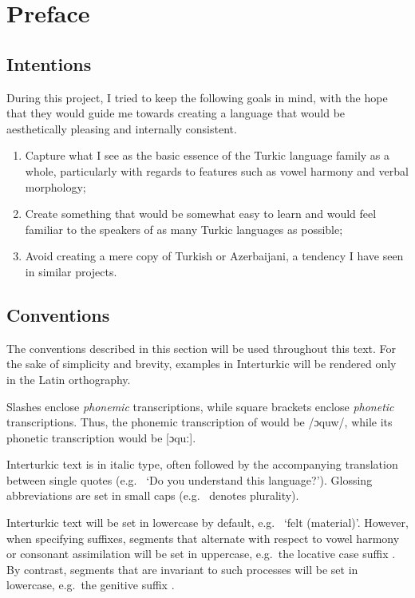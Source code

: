\chapter{Preface}

\section{Intentions}

During this project, I tried to keep the following goals in mind, with the hope that they would guide me towards creating a language that would be aesthetically pleasing and internally consistent.

\begin{enumerate}
	\item Capture what I see as the basic essence of the Turkic language family as a whole, particularly with regards to features such as vowel harmony and verbal morphology;
	\item Create something that would be somewhat easy to learn and would feel familiar to the speakers of as many Turkic languages as possible;
	\item Avoid creating a mere copy of Turkish or Azerbaijani, a tendency I have seen in similar projects.
\end{enumerate}

\section{Conventions}

The conventions described in this section will be used throughout this text.
For the sake of simplicity and brevity, examples in Interturkic will be rendered only in the Latin orthography.

Slashes enclose \emph{phonemic} transcriptions, while square brackets enclose \emph{phonetic} transcriptions.
Thus, the phonemic transcription of  would be /ɔquw/, while its phonetic transcription would be [ɔquː].

Interturkic text is in italic type, often followed by the accompanying translation between single quotes (e.g.\  `Do you understand this language?').
Glossing abbreviations are set in small caps (e.g.\ \Pl{} denotes plurality).

Interturkic text will be set in lowercase by default, e.g.\  `felt (material)'.
However, when specifying suffixes, segments that alternate with respect to vowel harmony or consonant assimilation will be set in uppercase, e.g.\ the locative case suffix .
By contrast, segments that are invariant to such processes will be set in lowercase, e.g.\ the genitive suffix .

